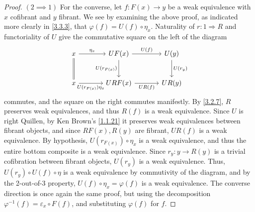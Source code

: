 \begin{proof}
	$(2\implies 1)$ For the converse, let $f : F(x) \to y$ be a weak equivalence with $x$ cofibrant and $y$ fibrant. We see by examining the above proof, as indicated more clearly in \cref{3.3.3}, that $\varphi(f)=U(f)\circ \eta_x$. Naturality of $r : 1 \Rightarrow R$ and functoriality of $U$ give the commutative square on the left of the diagram
	\[\begin{tikzcd}[row sep = 2.5em, column sep = 3.5em]
	x \ar[" \eta_x ", r] \ar[equals, d]  & UF(x)\ar[" U(f) ", r] \ar[" U(r_{F(x)} ) "', d]  & U(y)\ar[" U(r_y) ", d]  \\
	x \ar[" U(r_{F(x)} )\eta_x "', r]  & URF(x)\ar[" UR(f) "', r]  & UR(y)
	\end{tikzcd}\]
	commutes, and the square on the right commutes manifestly. By \cref{3.2.7}, $R$ preserves weak equivalences, and thus $R(f)$ is a weak equivalence. Since $U$ is right Quillen, by Ken Brown's \cref{1.1.21} it preserves weak equivalences between fibrant objects, and since $RF(x),R(y)$ are fibrant, $UR(f)$ is a weak equivalence. By hypothesis, $U(r_{F(x)} )\circ \eta_x$ is a weak equivalence, and thus the entire bottom composite is a weak equivalence. Since $r_y : y \to R(y)$ is a trivial cofibration between fibrant objects, $U(r_y)$ is a weak equivalence. Thus, $U(r_y)\circ U(f)\circ \eta$ is a weak equivalence by commutivity of the diagram, and by the 2-out-of-3 property, $U(f)\circ \eta_x=\varphi(f)$ is a weak equivalence. The converse direction is once again the same proof, but using the decomposition $\varphi ^{-1} (f)=\varepsilon _x \circ F(f)$, and substituting $\varphi(f)$ for $f$.


\end{proof}
